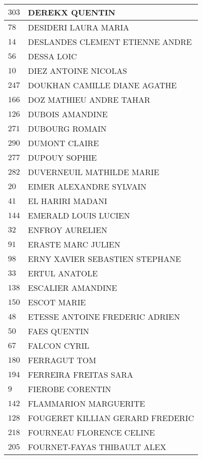 \begin{xltabular}{\linewidth}{|l|X|}
    \hline
    $303$ & DEREKX QUENTIN \\
    \hline
    $78$ & DESIDERI LAURA MARIA \\
    \hline
    $14$ & DESLANDES CLEMENT ETIENNE ANDRE \\
    \hline
    $56$ & DESSA LOIC \\
    \hline
    $10$ & DIEZ ANTOINE NICOLAS \\
    \hline
    $247$ & DOUKHAN CAMILLE DIANE AGATHE \\
    \hline
    $166$ & DOZ MATHIEU ANDRE TAHAR \\
    \hline
    $126$ & DUBOIS AMANDINE \\
    \hline
    $271$ & DUBOURG ROMAIN \\
    \hline
    $290$ & DUMONT CLAIRE \\
    \hline
    $277$ & DUPOUY SOPHIE \\
    \hline
    $282$ & DUVERNEUIL MATHILDE MARIE \\
    \hline
    $20$ & EIMER ALEXANDRE SYLVAIN \\
    \hline
    $41$ & EL HARIRI MADANI \\
    \hline
    $144$ & EMERALD LOUIS LUCIEN \\
    \hline
    $32$ & ENFROY AURELIEN \\
    \hline
    $91$ & ERASTE MARC JULIEN \\
    \hline
    $98$ & ERNY XAVIER SEBASTIEN STEPHANE \\
    \hline
    $33$ & ERTUL ANATOLE \\
    \hline
    $138$ & ESCALIER AMANDINE \\
    \hline
    $150$ & ESCOT MARIE \\
    \hline
    $48$ & ETESSE ANTOINE FREDERIC ADRIEN \\
    \hline
    $50$ & FAES QUENTIN \\
    \hline
    $67$ & FALCON CYRIL \\
    \hline
    $180$ & FERRAGUT TOM \\
    \hline
    $194$ & FERREIRA FREITAS SARA \\
    \hline
    $9$ & FIEROBE CORENTIN \\
    \hline
    $142$ & FLAMMARION MARGUERITE \\
    \hline
    $128$ & FOUGERET KILLIAN GERARD FREDERIC \\
    \hline
    $218$ & FOURNEAU FLORENCE CELINE \\
    \hline
    $205$ & FOURNET-FAYAS THIBAULT ALEX \\

\end{xltabular}
